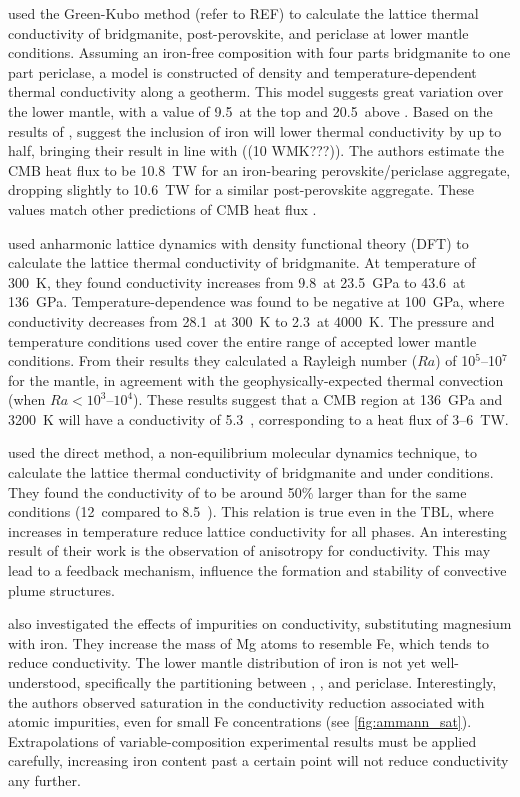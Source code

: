 \citet{Haigis2012} used the Green-Kubo method (refer to REF) to calculate the lattice thermal conductivity of bridgmanite, post-perovskite, and periclase at lower mantle conditions. Assuming an iron-free composition with four parts bridgmanite to one part periclase, a model is constructed of density and temperature-dependent thermal conductivity along a geotherm. This model suggests great variation over the lower mantle, with a value of 9.5~\wmks at the top and 20.5~\wmks above \ddd. Based on the results of \citet{Manthilake2011}, \citeauthor{Haigis2012} suggest the inclusion of iron will lower thermal conductivity by up to half, bringing their result in line with \citet{Lay2006} ((10 WMK???)). The authors estimate the CMB heat flux to be 10.8~TW for an iron-bearing perovskite/periclase aggregate, dropping slightly to 10.6~TW for a similar post-perovskite aggregate. These values match other predictions of CMB heat flux \citep[e.g.][]{Lay2008}.

\citet{Dekura2013} used \ais anharmonic lattice dynamics with density functional theory (DFT) to calculate the lattice thermal conductivity of bridgmanite. At temperature of 300~K, they found conductivity increases from 9.8~\wmks at 23.5~GPa to 43.6~\wmks at 136~GPa. Temperature-dependence was found to be negative at 100~GPa, where conductivity decreases from 28.1~\wmks at 300~K to 2.3~\wmks at 4000~K. The pressure and temperature conditions used cover the entire range of accepted lower mantle conditions. From their results they calculated a Rayleigh number ($Ra$) of 10$^5$--10$^7$ for the mantle, in agreement with the geophysically-expected thermal convection (when $Ra < 10^3$--$10^4$). These results suggest that a CMB region at 136~GPa and 3200~K will have a conductivity of 5.3~\wmk, corresponding to a heat flux of 3--6~TW.

\citet{Ammann2014} used the direct method, a non-equilibrium molecular dynamics technique, to calculate the lattice thermal conductivity of bridgmanite and \ppvs under \ddds conditions. They found the conductivity of \ppv to be around 50\% larger than \bdg for the same conditions (12~\wmks compared to 8.5~\wmk). This relation is true even in the TBL, where increases in temperature reduce lattice conductivity for all \mgsios phases. An interesting result of their work is the observation of anisotropy for \ppvs conductivity. This may lead to a feedback mechanism, influence the formation and stability of convective plume structures.

\citeauthor{Ammann2014} also investigated the effects of impurities on conductivity, substituting magnesium with iron. They increase the mass of Mg atoms to resemble Fe, which tends to reduce conductivity. The lower mantle distribution of iron is not yet well-understood, specifically the partitioning between \bdg, \ppv, and periclase. Interestingly, the authors observed saturation in the conductivity reduction associated with atomic impurities, even for small Fe concentrations (see \ref{fig:ammann_sat}). Extrapolations of variable-composition experimental results must be applied carefully, increasing iron content past a certain point will not reduce conductivity any further.


